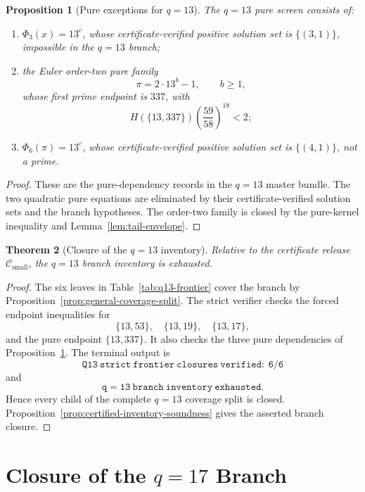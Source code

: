 \documentclass[11pt]{article}
\newtheorem{theorem}{Theorem}[section]
\newtheorem{proposition}[theorem]{Proposition}
\theoremstyle{definition}
\theoremstyle{remark}
\newcommand{\Hfun}{H}
\newcommand{\Csmall}{\ensuremath{\mathcal C_{\mathrm{small}}}}
\begin{document}
\begin{proposition}[Pure exceptions for \(q=13\)]
\label{prop:q13-pure}
The \(q=13\) pure screen consists of:
\begin{enumerate}[label=(\roman*),leftmargin=2.2em]
\item \(\Phi_3(x)=13^c\), whose certificate-verified positive solution set is
\(\{(3,1)\}\),
impossible in the \(q=13\) branch;
\item the Euler order-two pure family
\[
  \pi=2\cdot13^b-1,\qquad b\ge1,
\]
whose first prime endpoint is \(337\), with
\[
  \Hfun(\{13,337\})\left(\frac{59}{58}\right)^{18}<2;
\]
\item \(\Phi_6(\pi)=13^c\), whose certificate-verified positive solution set is
\(\{(4,1)\}\),
not a prime.
\end{enumerate}
\end{proposition}

\begin{proof}
These are the pure-dependency records in the \(q=13\) master bundle.  The two
quadratic pure equations are eliminated by their certificate-verified solution sets and the
branch hypotheses.  The order-two family is closed by the pure-kernel
inequality and Lemma~\ref{lem:tail-envelope}.
\end{proof}

\begin{theorem}[Closure of the \(q=13\) inventory]
\label{thm:q13-closed}
Relative to the certificate release \(\Csmall\), the \(q=13\) branch inventory is
exhausted.
\end{theorem}

\begin{proof}
The six leaves in Table~\ref{tab:q13-frontier} cover the branch by
Proposition~\ref{prop:general-coverage-split}.  The strict verifier checks the
forced endpoint inequalities for
\[
  \{13,53\},\quad \{13,19\},\quad \{13,17\},
\]
and the pure endpoint \(\{13,337\}\).  It also checks the three pure
dependencies of Proposition~\ref{prop:q13-pure}.  The terminal output is
\[
  \mathtt{Q13\ strict\ frontier\ closures\ verified:\ 6/6}
\]
and
\[
  \mathtt{q=13\ branch\ inventory\ exhausted}.
\]
Hence every child of the complete \(q=13\) coverage split is closed.
Proposition~\ref{prop:certified-inventory-soundness} gives the asserted
branch closure.
\end{proof}

\section{Closure of the \(q=17\) Branch}
\label{sec:q17}
\end{document}
